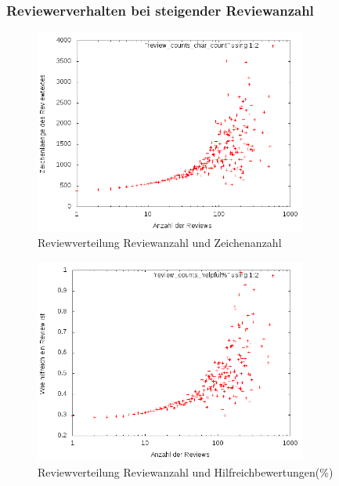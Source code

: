 \documentclass{beamer}
\begin{document}
	\begin{frame}
	\frametitle{Reviewerverhalten bei steigender Reviewanzahl}
	\begin{figure}[H]
\centering
    \includegraphics[width=0.8\textwidth]{_results/char_count2.png}
    \caption{Reviewverteilung Reviewanzahl und Zeichenanzahl}
\end{figure}
	\end{frame}
	
		\begin{frame}
	\begin{figure}[H]
\centering
    \includegraphics[width=0.8\textwidth]{_results/helpfull_count2.png}
    \caption{Reviewverteilung Reviewanzahl und Hilfreichbewertungen(\%)}
\end{figure}
	\end{frame}
	
\end{document}
